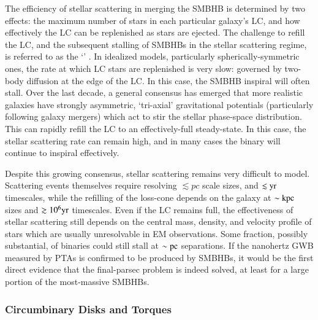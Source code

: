\documentclass[onecolumn,authoryear]{els-mrw}
\begin{document}
The efficiency of stellar scattering in merging the SMBHB is determined by two effects: the maximum number of stars in each particular galaxy's LC, and how effectively the LC can be replenished as stars are ejected.  The challenge to refill the LC, and the subsequent stalling of SMBHBs in the stellar scattering regime, is referred to as the `' \citep{Milosavljevic+Merritt-2003}.  In idealized models, particularly spherically-symmetric ones, the rate at which LC stars are replenished is very slow: governed by two-body diffusion at the edge of the LC.  In this case, the SMBHB inspiral will often stall.  Over the last decade, a general consensus has emerged that more realistic galaxies have strongly asymmetric, `tri-axial' gravitational potentials (particularly following galaxy mergers) which act to stir the stellar phase-space distribution.  This can rapidly refill the LC to an effectively-full steady-state.  In this case, the stellar scattering rate can remain high, and in many cases the binary will continue to inspiral effectively.

Despite this growing consensus, stellar scattering remains very difficult to model.  Scattering events themselves require resolving $\lesssim pc$ scale sizes, and $\lesssim \mathrm{yr}$ timescales, while the refilling of the loss-cone depends on the galaxy at $\sim \mathrm{kpc}$ sizes and $\gtrsim 10^6 \mathrm{yr}$ timescales.  Even if the LC remains full, the effectiveness of stellar scattering still depends on the central mass, density, and velocity profile of stars which are usually unresolvable in EM observations.  Some fraction, possibly substantial, of binaries could still stall at $\sim \mathrm{pc}$ separations.  If the nanohertz GWB measured by PTAs is confirmed to be produced by SMBHBs, it would be the first direct evidence that the final-parsec problem is indeed solved, at least for a large portion of the most-massive SMBHBs.

\subsubsection{Circumbinary Disks and Torques}

\end{document}
